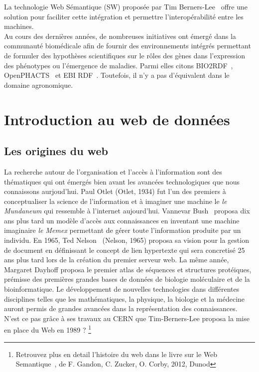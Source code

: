 La technologie Web Sémantique (SW) proposée par Tim Berners-Lee~\cite{berners2001semweb} offre une solution pour faciliter cette intégration et permettre l'interopérabilité entre les machines. \\

Au cours des dernières années, de nombreuses initiatives ont émergé dans la communauté biomédicale afin de fournir des environnements intégrés permettant de formuler des hypothèses scientifiques sur le rôles des gènes dans l’expression des phénotypes ou l’émergence de maladies. Parmi elles citons BIO2RDF~\cite{Belleau2008a}, OpenPHACTS~\cite{williams2012} et EBI RDF~\cite{Jupp2014}. Toutefois, il n’y a pas d’équivalent dans le domaine agronomique. \\




\section{Introduction au web de données}
\subsection{Les origines du web}

La recherche autour de l’organisation et l’accès à l’information sont des thématiques qui ont émergés bien avant les avancées technologiques que nous connaissons aurjoud'hui. Paul Otlet\cite{Otlet1934} (Otlet, 1934) fut l'un des premiers à conceptualiser la science de l'information et à imaginer une machine le \textit{ le Mundaneum} qui ressemble à l'internet aujourd'hui. Vannevar Bush~\cite{Vandenbussche2011} proposa dix ans plus tard un modèle d'accès aux connaissances en inventant une machine imaginaire  \textit{le Memex} permettant de gérer toute l'information produite par un individu. En 1965, Ted Nelson~\cite{Nelson1991} (Nelson, 1965) proposa sa vision pour la gestion de document en définissant le concept de lien hypertexte qui sera concretisé 25 ans plus tard lors de la création du premier serveur web. La même année, Margaret Dayhoff proposa le premier atlas de séquences et structures protéiques, prémisse des premières grandes bases de données de biologie moléculaire et de la bioinformatique. Le développement de nouvelles technologies dans différentes disciplines telles que les mathématiques, la physique, la biologie et la médecine auront permis de grandes avancées dans la représentation des connaissances. N'est ce pas grâce à ses travaux au CERN que Tim-Berners-Lee proposa la mise en place du Web en 1989 ? \footnote{Retrouvez plus en detail l'histoire du web dans le livre sur le Web Semantique~\cite{GandonFZuckerCorby2012}, de F. Gandon, C. Zucker, O. Corby, 2012, Dunod} 

